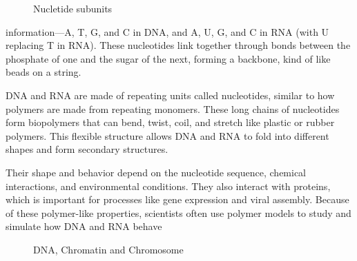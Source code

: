 \documentclass[12pt]{article}
\begin{document}
\begin{flushleft}
\begin{figure}[!ht]

  \caption{Nucletide subunits}
\end{figure}


\noindent information—A, T, G, and C in DNA, and A, U, G, and C in RNA (with U replacing T in RNA). These nucleotides link together through bonds between the phosphate of one and the sugar of the next, forming a backbone, kind of like beads on a string. 



DNA and RNA are made of repeating units called nucleotides, similar to how polymers are made from repeating monomers. These long chains of nucleotides form biopolymers that can bend, twist, coil, and stretch like plastic or rubber polymers. This flexible structure allows DNA and RNA to fold into different shapes and form secondary structures.

Their shape and behavior depend on the nucleotide sequence, chemical interactions, and environmental conditions. They also interact with proteins, which is important for processes like gene expression and viral assembly. Because of these polymer-like properties, scientists often use polymer models to study and simulate how DNA and RNA behave










\begin{figure}[!ht]
  \centering
  
  \caption{DNA, Chromatin and Chromosome\cite{byjus_chromatin}}
\end{figure}




\end{flushleft}
\end{document}
